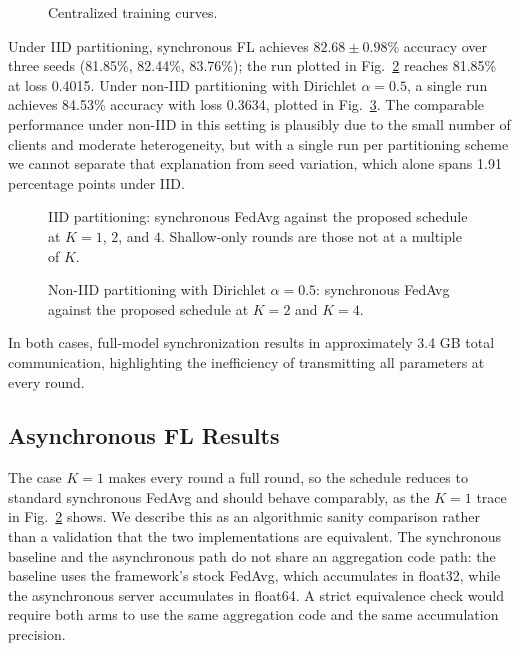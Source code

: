 \documentclass[10pt,conference]{IEEEtran}
\begin{document}
\begin{figure}[!t]
\centering

\caption{Centralized training curves.}
\label{fig:centralized}
\end{figure}

Under IID partitioning, synchronous FL achieves $82.68 \pm 0.98\%$ accuracy over three seeds (81.85\%, 82.44\%, 83.76\%); the run plotted in Fig.~\ref{fig:results_iid} reaches 81.85\% at loss 0.4015. Under non-IID partitioning with Dirichlet $\alpha=0.5$, a single run achieves 84.53\% accuracy with loss 0.3634, plotted in Fig.~\ref{fig:results_noniid}. The comparable performance under non-IID in this setting is plausibly due to the small number of clients and moderate heterogeneity, but with a single run per partitioning scheme we cannot separate that explanation from seed variation, which alone spans 1.91 percentage points under IID.

\begin{figure}[!t]
\centering

\caption{IID partitioning: synchronous FedAvg against the proposed schedule at $K=1$, $2$, and $4$. Shallow-only rounds are those not at a multiple of $K$.}
\label{fig:results_iid}
\end{figure}

\begin{figure}[!t]
\centering

\caption{Non-IID partitioning with Dirichlet $\alpha=0.5$: synchronous FedAvg against the proposed schedule at $K=2$ and $K=4$.}
\label{fig:results_noniid}
\end{figure}

In both cases, full-model synchronization results in approximately 3.4 GB total communication, highlighting the inefficiency of transmitting all parameters at every round.

\subsection{Asynchronous FL Results}

The case $K=1$ makes every round a full round, so the schedule reduces to standard synchronous FedAvg and should behave comparably, as the $K=1$ trace in Fig.~\ref{fig:results_iid} shows. We describe this as an algorithmic sanity comparison rather than a validation that the two implementations are equivalent. The synchronous baseline and the asynchronous path do not share an aggregation code path: the baseline uses the framework's stock FedAvg, which accumulates in float32, while the asynchronous server accumulates in float64. A strict equivalence check would require both arms to use the same aggregation code and the same accumulation precision.
\end{document}
